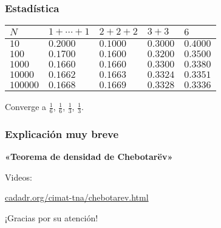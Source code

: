 \documentclass{beamer}
\begin{document}

\begin{frame}[fragile]
  \frametitle{Estadística}

  \begin{center}
    \renewcommand{\arraystretch}{1.5}
    \begin{tabular}{lx{1.5cm}x{1.5cm}x{1.5cm}x{1.5cm}}
      $N$      & $1+\cdots+1$ & $2+2+2$ & $3+3$ & $6$ \tabularnewline
      \hline
      $10$     & $0.2000$ & $0.1000$ & $0.3000$ & $0.4000$ \tabularnewline
      $100$    & $0.1700$ & $0.1600$ & $0.3200$ & $0.3500$ \tabularnewline
      $1000$   & $0.1660$ & $0.1660$ & $0.3300$ & $0.3380$ \tabularnewline
      $10000$  & $0.1662$ & $0.1663$ & $0.3324$ & $0.3351$ \tabularnewline
      $100000$ & $0.1668$ & $0.1669$ & $0.3328$ & $0.3336$ \tabularnewline
    \end{tabular}
  \end{center}

  Converge a $\frac{1}{6}$, $\frac{1}{6}$, $\frac{1}{3}$, $\frac{1}{3}$.
\end{frame}


\begin{frame}[fragile]
  \frametitle{Explicación muy breve}

  \textbf{«Teorema de densidad de Chebotarëv»}
\end{frame}


\begin{frame}[plain]
  \headingfont

  \begin{center}
    {\large Videos:

      \vspace{2em}

      \href{https://cadadr.org/cimat-tna/chebotarev.html}{cadadr.org/cimat-tna/chebotarev.html}

    }
  \end{center}
\end{frame}


\begin{frame}[plain]
  \headingfont

  \begin{center}
    {\huge ¡Gracias por su atención!}
  \end{center}
\end{frame}
\end{document}
